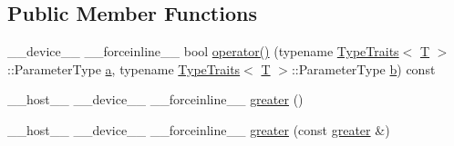 \subsection*{Public Member Functions}
\begin{DoxyCompactItemize}
\item 
\-\_\-\-\_\-device\-\_\-\-\_\- \-\_\-\-\_\-forceinline\-\_\-\-\_\- bool \hyperlink{structcv_1_1gpu_1_1device_1_1greater_a68d279368df0362b9475104421252ec6}{operator()} (typename \hyperlink{structcv_1_1gpu_1_1device_1_1TypeTraits}{Type\-Traits}$<$ \hyperlink{calib3d_8hpp_a3efb9551a871ddd0463079a808916717}{T} $>$\-::Parameter\-Type \hyperlink{legacy_8hpp_a1031d0e0a97a340abfe0a6ab9e831045}{a}, typename \hyperlink{structcv_1_1gpu_1_1device_1_1TypeTraits}{Type\-Traits}$<$ \hyperlink{calib3d_8hpp_a3efb9551a871ddd0463079a808916717}{T} $>$\-::Parameter\-Type \hyperlink{legacy_8hpp_ac04272e8ca865b8fba18d36edae9fd2a}{b}) const 
\item 
\-\_\-\-\_\-host\-\_\-\-\_\- \-\_\-\-\_\-device\-\_\-\-\_\- \-\_\-\-\_\-forceinline\-\_\-\-\_\- \hyperlink{structcv_1_1gpu_1_1device_1_1greater_ab16403899ec33d0cb461e79cf122b772}{greater} ()
\item 
\-\_\-\-\_\-host\-\_\-\-\_\- \-\_\-\-\_\-device\-\_\-\-\_\- \-\_\-\-\_\-forceinline\-\_\-\-\_\- \hyperlink{structcv_1_1gpu_1_1device_1_1greater_a0003ac3396f35a446f9130fe3b6b9b63}{greater} (const \hyperlink{structcv_1_1gpu_1_1device_1_1greater}{greater} \&)
\end{DoxyCompactItemize}


